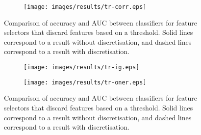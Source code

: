 \begin{figure}[htbp]
\begin{subfigure}{\textwidth}
\texttt{[image: images/results/tr-corr.eps]}
\caption{}
\label{fig:tr-threshold-corr}
\end{subfigure}
\caption[]{Comparison of accuracy and AUC between classifiers for feature selectors that discard features based on a threshold. Solid lines correspond to a result without discretisation, and dashed lines correspond to a result with discretisation.}
\label{fig:tr-threshold}
\end{figure}

\begin{figure}[htbp]
\ContinuedFloat
\begin{subfigure}{\textwidth}
\texttt{[image: images/results/tr-ig.eps]}
\caption{}
\label{fig:tr-threshold-ig}
\end{subfigure}

\begin{subfigure}{\textwidth}
\texttt{[image: images/results/tr-oner.eps]}
\caption{}
\label{fig:tr-threshold-oner}
\end{subfigure}
\caption{Comparison of accuracy and AUC between classifiers for feature selectors that discard features based on a threshold. Solid lines correspond to a result without discretisation, and dashed lines correspond to a result with discretisation.}
\end{figure}

